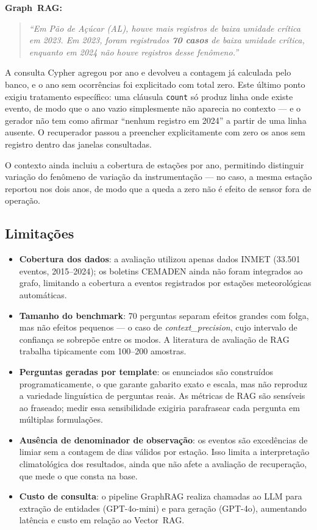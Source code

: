\documentclass[conference]{IEEEtran}
\begin{document}
\textbf{Graph~RAG:}
\begin{quote}
\textit{``Em Pão de Açúcar (AL), houve mais registros de baixa umidade
crítica em 2023. Em 2023, foram registrados \textbf{70 casos} de baixa
umidade crítica, enquanto em 2024 não houve registros desse
fenômeno.''}
\end{quote}
A consulta Cypher agregou por ano e devolveu a contagem já calculada
pelo banco, e o ano sem ocorrências foi explicitado com total zero.
Este último ponto exigiu tratamento específico: uma cláusula
\texttt{count} só produz linha onde existe evento, de modo que o ano
vazio simplesmente não aparecia no contexto --- e o gerador não tem
como afirmar ``nenhum registro em 2024'' a partir de uma linha ausente.
O recuperador passou a preencher explicitamente com zero os anos sem
registro dentro das janelas consultadas.

O contexto ainda incluiu a cobertura de estações por ano, permitindo
distinguir variação do fenômeno de variação da instrumentação --- no
caso, a mesma estação reportou nos dois anos, de modo que a queda a
zero não é efeito de sensor fora de operação.

\subsection{Limitações}

\begin{itemize}
  \item \textbf{Cobertura dos dados}: a avaliação utilizou apenas
        dados INMET (33.501 eventos, 2015--2024); os boletins CEMADEN
        ainda não foram integrados ao grafo, limitando a cobertura
        a eventos registrados por estações meteorológicas automáticas.
  \item \textbf{Tamanho do benchmark}: 70 perguntas separam efeitos
        grandes com folga, mas não efeitos pequenos --- o caso de
        \textit{context\_precision}, cujo intervalo de confiança se
        sobrepõe entre os modos. A literatura de avaliação de RAG
        trabalha tipicamente com 100--200 amostras.
  \item \textbf{Perguntas geradas por template}: os enunciados são
        construídos programaticamente, o que garante gabarito exato e
        escala, mas não reproduz a variedade linguística de perguntas
        reais. As métricas de RAG são sensíveis ao fraseado; medir essa
        sensibilidade exigiria parafrasear cada pergunta em múltiplas
        formulações.
  \item \textbf{Ausência de denominador de observação}: os eventos são
        excedências de limiar sem a contagem de dias válidos por
        estação. Isso limita a interpretação climatológica dos
        resultados, ainda que não afete a avaliação de recuperação,
        que mede o que consta na base.
  \item \textbf{Custo de consulta}: o pipeline GraphRAG realiza
        chamadas ao LLM para extração de entidades (GPT-4o-mini)
        e para geração (GPT-4o), aumentando latência e custo
        em relação ao Vector~RAG.
\end{itemize}
\end{document}
